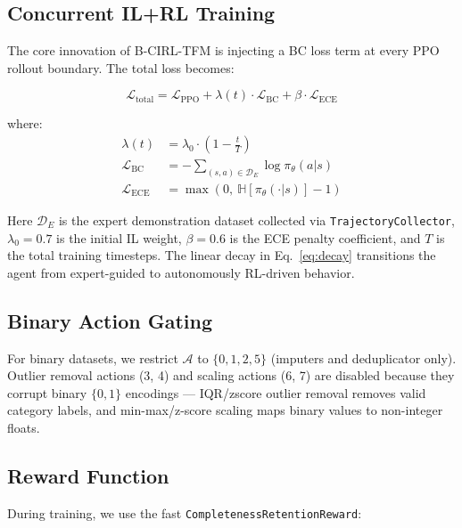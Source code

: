 \documentclass[conference]{IEEEtran}
\begin{document}
\subsection{Concurrent IL+RL Training}
\label{sec:cirl}

The core innovation of B-CIRL-TFM is injecting a BC loss term at every
PPO rollout boundary. The total loss becomes:

\begin{equation}
\mathcal{L}_{\text{total}} = \mathcal{L}_{\text{PPO}} + \lambda(t) \cdot
\mathcal{L}_{\text{BC}} + \beta \cdot \mathcal{L}_{\text{ECE}}
\label{eq:total_loss}
\end{equation}

where:
\begin{align}
\lambda(t) &= \lambda_0 \cdot \left(1 - \frac{t}{T}\right)
\label{eq:decay} \\
\mathcal{L}_{\text{BC}} &= -\sum_{(s,a) \in \mathcal{D}_E}
\log \pi_\theta(a | s)
\label{eq:bc} \\
\mathcal{L}_{\text{ECE}} &= \max\left(0,\ \mathbb{H}[\pi_\theta(\cdot|s)]
- 1\right)
\label{eq:ece}
\end{align}

Here $\mathcal{D}_E$ is the expert demonstration dataset collected via
\texttt{TrajectoryCollector}, $\lambda_0 = 0.7$ is the initial IL weight,
$\beta = 0.6$ is the ECE penalty coefficient, and $T$ is the total
training timesteps. The linear decay in Eq.~\ref{eq:decay} transitions
the agent from expert-guided to autonomously RL-driven behavior.

\subsection{Binary Action Gating}

For binary datasets, we restrict $\mathcal{A}$ to $\{0, 1, 2, 5\}$
(imputers and deduplicator only). Outlier removal actions (3, 4) and
scaling actions (6, 7) are disabled because they corrupt binary $\{0,1\}$
encodings — IQR/zscore outlier removal removes valid category labels, and
min-max/z-score scaling maps binary values to non-integer floats.

\subsection{Reward Function}
\label{sec:reward}

During training, we use the fast \texttt{CompletenessRetentionReward}:
\end{document}
